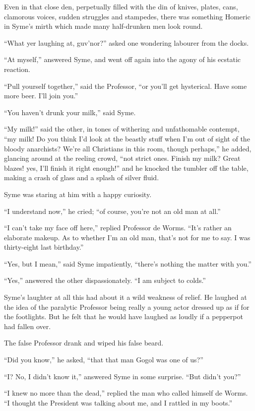 Even in that close den, perpetually filled with the din of knives, plates, cans, clamorous voices, sudden struggles and stampedes, there was something Homeric in Syme’s mirth which made many half-drunken men look round.

“What yer laughing at, guv’nor?” asked one wondering labourer from the docks.

“At myself,” answered Syme, and went off again into the agony of his ecstatic reaction.

“Pull yourself together,” said the Professor, “or you’ll get hysterical. Have some more beer. I’ll join you.”

“You haven’t drunk your milk,” said Syme.

“My milk!” said the other, in tones of withering and unfathomable contempt, “my milk! Do you think I’d look at the beastly stuff when I’m out of sight of the bloody anarchists? We’re all Christians in this room, though perhaps,” he added, glancing around at the reeling crowd, “not strict ones. Finish my milk? Great blazes! yes, I’ll finish it right enough!” and he knocked the tumbler off the table, making a crash of glass and a splash of silver fluid.

Syme was staring at him with a happy curiosity.

“I understand now,” he cried; “of course, you’re not an old man at all.”

“I can’t take my face off here,” replied Professor de Worms. “It’s rather an elaborate makeup. As to whether I’m an old man, that’s not for me to say. I was thirty-eight last birthday.”

“Yes, but I mean,” said Syme impatiently, “there’s nothing the matter with you.”

“Yes,” answered the other dispassionately. “I am subject to colds.”

Syme’s laughter at all this had about it a wild weakness of relief. He laughed at the idea of the paralytic Professor being really a young actor dressed up as if for the footlights. But he felt that he would have laughed as loudly if a pepperpot had fallen over.

The false Professor drank and wiped his false beard.

“Did you know,” he asked, “that that man Gogol was one of us?”

“I? No, I didn’t know it,” answered Syme in some surprise. “But didn’t you?”

“I knew no more than the dead,” replied the man who called himself de Worms. “I thought the President was talking about me, and I rattled in my boots.”

